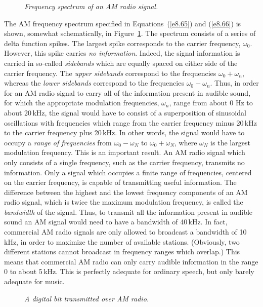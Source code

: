 \begin{figure}
\epsfysize=3.5in
\centerline{}
\caption{\em Frequency spectrum of an AM radio signal.}\label{f8.4}   
\end{figure}

The AM frequency spectrum specified in Equations~(\ref{e8.65}) and (\ref{e8.66})
is shown, somewhat schematically, in Figure~\ref{f8.4}. The spectrum consists of
a series of delta function spikes. The largest spike corresponds to the carrier frequency,
$\omega_0$. However, this spike carries {\em no information}. Indeed, the signal information
is carried in so-called {\em sidebands}\/ which are equally spaced on either side of the
carrier frequency. The {\em upper sidebands}\/ correspond to the frequencies
$\omega_0+\omega_n$, whereas the {\em lower sidebands}\/ correspond to the
frequencies $\omega_0-\omega_n$. Thus, in order for an AM radio signal
to carry all of the information present in audible sound, for which the appropriate modulation frequencies, $\omega_n$, range
from about 0 Hz to about 20\,kHz, the signal would have to consist of a superposition
of sinusoidal oscillations with frequencies which range from the carrier frequency
minus 20\,kHz to the carrier frequency plus 20\,kHz. In other words, the signal would have to occupy a
{\em range of frequencies}\/ from $\omega_0-\omega_N$ to $\omega_0+\omega_N$,
where $\omega_N$ is the largest modulation frequency. This is an important result.
An AM radio signal which only consists of a single frequency, such as the carrier frequency, transmits
no information. Only a signal which occupies a finite range of frequencies, centered
on the carrier frequency, is capable of transmitting useful information. The difference between the highest and the lowest frequency components of an AM radio signal, which
is twice the maximum modulation frequency,
is called the {\em bandwidth}\/ of the signal. Thus, to transmit all the information
present in audible sound an AM signal would need to have a bandwidth of 40\,kHz.
In fact, commercial AM radio signals are only allowed to broadcast a bandwidth of
10\,kHz, in order to maximize the number of available stations. (Obviously, two
different stations cannot broadcast in frequency ranges which overlap.) This
means that commercial AM radio can only carry audible information in the
range 0 to about 5\,kHz. This is perfectly adequate for ordinary speech, 
but only barely adequate for music. 

\begin{figure}
\epsfysize=2.5in
\centerline{}
\caption{\em A digital bit transmitted over AM radio.}\label{f8.5}   
\end{figure}

